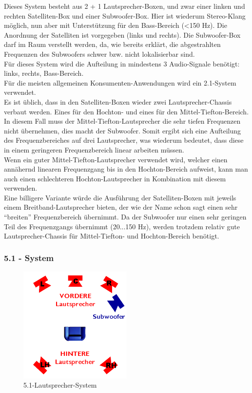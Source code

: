 Dieses System besteht aus 2 + 1 Lautsprecher-Boxen, und zwar einer linken und rechten Satelliten-Box und einer Subwoofer-Box.
Hier ist wiederum Stereo-Klang möglich, nun aber mit Unterstützung für den Bass-Bereich (<150 Hz).
Die Anordnung der Satelliten ist vorgegeben (links und rechts).
Die Subwoofer-Box darf im Raum verstellt werden, da, wie bereits erklärt, die abgestrahlten Frequenzen des Subwoofers schwer bzw. nicht lokalisierbar sind.\\
Für dieses System wird die Aufteilung in mindestens 3 Audio-Signale benötigt:
links, rechts, Bass-Bereich.\\
Für die meisten allgemeinen Konsumenten-Anwendungen wird ein 2.1-System verwendet.\\ 
Es ist üblich, dass in den Satelliten-Boxen wieder zwei Lautsprecher-Chassis verbaut werden.
Eines für den Hochton- und eines für den Mittel-Tiefton-Bereich.
In diesem Fall muss der Mittel-Tiefton-Lautsprecher die sehr tiefen Frequenzen nicht übernehmen, dies macht der Subwoofer.
Somit ergibt sich eine Aufteilung des Frequenzbereiches auf drei Lautsprecher, was wiederum bedeutet, dass diese in einem geringeren Frequenzbereich linear arbeiten müssen.\\
Wenn ein guter Mittel-Tiefton-Lautsprecher verwendet wird, welcher einen annähernd linearen Frequenzgang bis in den Hochton-Bereich aufweist, kann man auch einen schlechteren Hochton-Lautsprecher in Kombination mit diesem verwenden.\\
Eine billigere Variante würde die Ausführung der Satelliten-Boxen mit jeweils einem Breitband-Lautsprecher bieten, der wie der Name schon sagt einen sehr \enquote{breiten} Frequenzbereich übernimmt.
Da der Subwoofer nur einen sehr geringen Teil des Frequenzgangs übernimmt (20...150 Hz), werden trotzdem relativ gute Lautsprecher-Chassis für Mittel-Tiefton- und Hochton-Bereich benötigt.



\subsubsection*{5.1 - System}
\begin{figure} [H]
	\centering
	\includegraphics[width=0.5\textwidth]{img/Grundlagen/Mehrweg-Lautsprechersysteme/DOLBYDigital51-cut.jpg}
	\caption[5.1-Lautsprecher-System]{5.1-Lautsprecher-System\footnotemark}
	\label{fig:3.2.6}
\end{figure}

